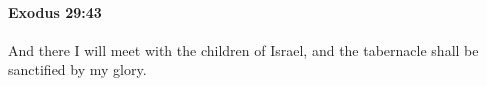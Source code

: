
		\paragraph{Exodus 29:43} %
			\label{EXODUS-29-43}

			And there I will meet with the children of Israel, and the tabernacle shall be sanctified by my glory.


